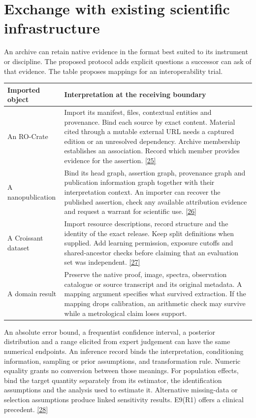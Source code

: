 \documentclass[11pt,a4paper]{article}
\newcommand{\partpage}[1]{\clearpage\section{#1}}
\newcommand{\topic}[1]{\par\smallskip{\sffamily\bfseries\color{ink}#1\par}\nobreak}
\newcommand{\src}[1]{\hyperlink{ref#1}{[#1]}}
\begin{document}
\partpage{Exchange with existing scientific infrastructure}
An archive can retain native evidence in the format best suited to its instrument or discipline. The proposed protocol adds explicit questions a successor can ask of that evidence. The table proposes mappings for an interoperability trial.

\small
\begin{tabularx}{\linewidth}{@{}L{.23\linewidth}Y@{}}
\toprule
\textbf{Imported object} & \textbf{Interpretation at the receiving boundary} \\ \midrule
An RO-Crate & Import its manifest, files, contextual entities and provenance. Bind each source by exact content. Material cited through a mutable external URL needs a captured edition or an unresolved dependency. Archive membership establishes an association. Record which member provides evidence for the assertion. \src{25} \\
A nanopublication & Bind its head graph, assertion graph, provenance graph and publication information graph together with their interpretation context. An importer can recover the published assertion, check any available attribution evidence and request a warrant for scientific use. \src{26} \\
A Croissant dataset & Import resource descriptions, record structure and the identity of the exact release. Keep split definitions when supplied. Add learning permission, exposure cutoffs and shared-ancestor checks before claiming that an evaluation set was independent. \src{27} \\
A domain result & Preserve the native proof, image, spectra, observation catalogue or source transcript and its original metadata. A mapping argument specifies what survived extraction. If the mapping drops calibration, an arithmetic check may survive while a metrological claim loses support. \\
\bottomrule
\end{tabularx}
\normalsize

\topic{Inference types constrain downstream use}
An absolute error bound, a frequentist confidence interval, a posterior distribution and a range elicited from expert judgement can have the same numerical endpoints. An inference record binds the interpretation, conditioning information, sampling or prior assumptions, and transformation rule. Numeric equality grants no conversion between those meanings. For population effects, bind the target quantity separately from its estimator, the identification assumptions and the analysis used to estimate it. Alternative missing-data or selection assumptions produce linked sensitivity results. E9(R1) offers a clinical precedent. \src{28}
\end{document}
